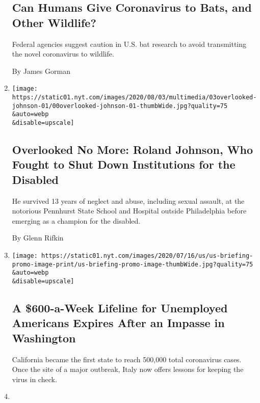 \begin{enumerate}
{  \subsection{Can Humans Give Coronavirus to Bats, and Other
  Wildlife?}\label{can-humans-give-coronavirus-to-bats-and-other-wildlife}}

  Federal agencies suggest caution in U.S. bat research to avoid
  transmitting the novel coronavirus to wildlife.

  By James Gorman
\item
  \href{/2020/07/31/obituaries/roland-johnson-overlooked.html}{}

  \texttt{[image: https://static01.nyt.com/images/2020/08/03/multimedia/03overlooked-johnson-01/00overlooked-johnson-01-thumbWide.jpg?quality=75\\\&auto=webp\\\&disable=upscale]}

  \hypertarget{overlooked-no-more-roland-johnson-who-fought-to-shut-down-institutions-for-the-disabled}{%
  \subsection{Overlooked No More: Roland Johnson, Who Fought to Shut
  Down Institutions for the
  Disabled}\label{overlooked-no-more-roland-johnson-who-fought-to-shut-down-institutions-for-the-disabled}}

  He survived 13 years of neglect and abuse, including sexual assault,
  at the notorious Pennhurst State School and Hospital outside
  Philadelphia before emerging as a champion for the disabled.

  By Glenn Rifkin
\item
  \href{/2020/07/31/world/coronavirus-covid-19.html}{}

  \texttt{[image: https://static01.nyt.com/images/2020/07/16/us/us-briefing-promo-image-print/us-briefing-promo-image-thumbWide.jpg?quality=75\\\&auto=webp\\\&disable=upscale]}

  \hypertarget{a-600-a-week-lifeline-for-unemployed-americans-expires-after-an-impasse-in-washington}{%
  \subsection{A \$600-a-Week Lifeline for Unemployed Americans Expires
  After an Impasse in
  Washington}\label{a-600-a-week-lifeline-for-unemployed-americans-expires-after-an-impasse-in-washington}}

  California became the first state to reach 500,000 total coronavirus
  cases. Once the site of a major outbreak, Italy now offers lessons for
  keeping the virus in check.
\item
  \href{/2020/07/31/world/asia/indonesia-coronavirus.html}{}


\end{enumerate}
